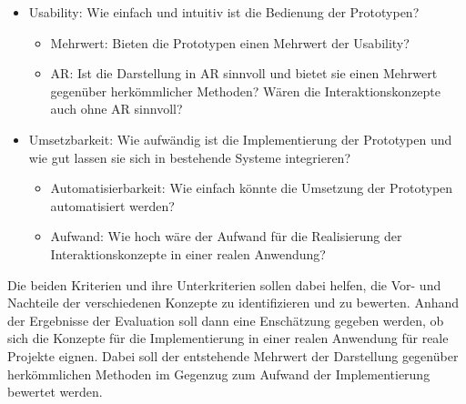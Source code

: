 \begin{itemize}
    \item Usability: Wie einfach und intuitiv ist die Bedienung der Prototypen?
    \begin{itemize}
        \item Mehrwert: Bieten die Prototypen einen Mehrwert der Usability?
        \item AR: Ist die Darstellung in AR sinnvoll und bietet sie einen Mehrwert gegenüber herkömmlicher Methoden? Wären die Interaktionskonzepte auch ohne AR sinnvoll?
    \end{itemize}
    \item Umsetzbarkeit: Wie aufwändig ist die Implementierung der Prototypen und wie gut lassen sie sich in bestehende Systeme integrieren?
    \begin{itemize}
        \item Automatisierbarkeit: Wie einfach könnte die Umsetzung der Prototypen automatisiert werden?
        \item Aufwand: Wie hoch wäre der Aufwand für die Realisierung der Interaktionskonzepte in einer realen Anwendung?
    \end{itemize}
\end{itemize}

Die beiden Kriterien und ihre Unterkriterien sollen dabei helfen, die Vor- und Nachteile der verschiedenen Konzepte zu identifizieren und zu bewerten.
Anhand der Ergebnisse der Evaluation soll dann eine Enschätzung gegeben werden, ob sich die Konzepte für die Implementierung in einer realen Anwendung für reale Projekte eignen.
Dabei soll der entstehende Mehrwert der Darstellung gegenüber herkömmlichen Methoden im Gegenzug zum Aufwand der Implementierung bewertet werden.
